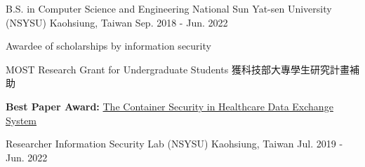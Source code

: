 

\begin{cventries}

  \cventry
  {B.S. in Computer Science and Engineering} %
  {National Sun Yat-sen University (NSYSU)} %
  {Kaohsiung, Taiwan} %
  {Sep. 2018 - Jun. 2022} %
  {
    \begin{cvitems} %
      \item {Awardee of scholarships by information security}
      \item {MOST Research Grant for Undergraduate Students 獲科技部大專學生研究計畫補助}
      \item {\textbf{Best Paper Award:} \href{https://github.com/25077667/Container_Security}{The Container Security in Healthcare Data Exchange System}}
    \end{cvitems}
  }

  \cventry
  {Researcher}
  {Information Security Lab (NSYSU)}
  {Kaohsiung, Taiwan} %
  {Jul. 2019 - Jun. 2022} %
  {}

\end{cventries}
